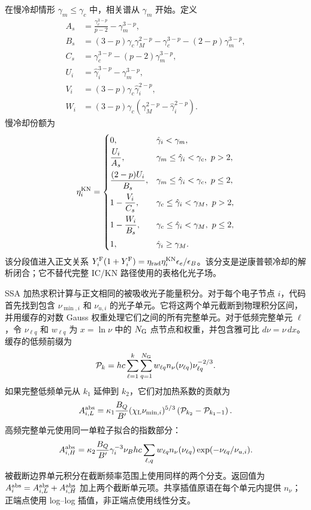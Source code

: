 \documentclass[twocolumn]{aastex702}
\begin{document}
在慢冷却情形 \(\gamma_m\le\gamma_c\) 中，相关谱从 \(\gamma_m\) 开始。定义
\begin{equation}
\begin{aligned}
A_s&=\frac{\gamma_c^{3-p}}{p-2}-\gamma_m^{3-p},\\
B_s&=(3-p)\gamma_c\gamma_M^{2-p}
-\gamma_c^{3-p}-(2-p)\gamma_m^{3-p},\\
C_s&=\gamma_c^{3-p}-(p-2)\gamma_m^{3-p},\\
U_i&=\hat\gamma_i^{3-p}-\gamma_m^{3-p},\\
V_i&=(3-p)\gamma_c\hat\gamma_i^{2-p},\\
W_i&=(3-p)\gamma_c(\gamma_M^{2-p}-\hat\gamma_i^{2-p}).
\end{aligned}
\end{equation}
慢冷却份额为
\begin{equation}
\eta_i^{\rm KN}=
\begin{cases}
0, & \hat\gamma_i<\gamma_m,\\[0.6ex]
\dfrac{U_i}{A_s},
& \gamma_m\le\hat\gamma_i<\gamma_c,\ p>2,\\[2ex]
\dfrac{(2-p)U_i}{B_s},
& \gamma_m\le\hat\gamma_i<\gamma_c,\ p\le2,\\[2ex]
1-\dfrac{V_i}{C_s},
& \gamma_c\le\hat\gamma_i<\gamma_M,\ p>2,\\[2ex]
1-\dfrac{W_i}{B_s},
& \gamma_c\le\hat\gamma_i<\gamma_M,\ p\le2,\\[2ex]
1, & \hat\gamma_i\ge\gamma_M.
\end{cases}
\end{equation}
该分段值进入正文关系 \(Y_i^{\rm F}(1+Y_i^{\rm F})=\eta_{\rm rad}\eta_i^{\rm KN}\epsilon_e/\epsilon_B\)。该分支是逆康普顿冷却的解析闭合；它不替代完整 IC/KN 路径使用的表格化光子场。

SSA 加热求积计算与正文相同的被吸收光子能量积分。对于每个电子节点 \(i\)，代码首先找到包含 \(\nu_{\min,i}\) 和 \(\nu_{u,i}\) 的光子单元。它将这两个单元截断到物理积分区间，并用缓存的对数 Gauss 权重处理它们之间的所有完整单元。对于低频完整单元 \(\ell\)，令 \(\nu_{\ell q}\) 和 \(w_{\ell q}\) 为 \(x=\ln\nu\) 中的 \(N_{\rm G}\) 点节点和权重，并包含雅可比 \(d\nu=\nu\,dx\)。缓存的低频前缀为
\begin{equation}
\mathcal P_k
=hc\sum_{\ell=1}^{k}\sum_{q=1}^{N_{\rm G}}
w_{\ell q}n_\nu(\nu_{\ell q})\nu_{\ell q}^{-2/3}.
\end{equation}
如果完整低频单元从 \(k_1\) 延伸到 \(k_2\)，它们对加热系数的贡献为
\begin{equation}
A_{i,L}^{\rm abs}
=\kappa_1\frac{B_Q}{B'}(\chi_{\rm L}\nu_{\min,i})^{5/3}
\left(\mathcal P_{k_2}-\mathcal P_{k_1-1}\right).
\end{equation}
高频完整单元使用同一单粒子拟合的指数部分：
\begin{equation}
A_{i,H}^{\rm abs}
=\kappa_2\frac{B_Q}{B'}\gamma_i^{-3}\nu_B hc
\sum_{\ell,q} w_{\ell q}n_\nu(\nu_{\ell q})
\exp(-\nu_{\ell q}/\nu_{u,i}).
\end{equation}
被截断边界单元积分在截断频率范围上使用同样的两个分支。返回值为 \(A_i^{\rm abs}=A_{i,L}^{\rm abs}+A_{i,H}^{\rm abs}\) 加上两个截断单元项。共享插值原语在每个单元内提供 \(n_\nu\)；正端点使用 log--log 插值，非正端点使用线性分支。
\end{document}
